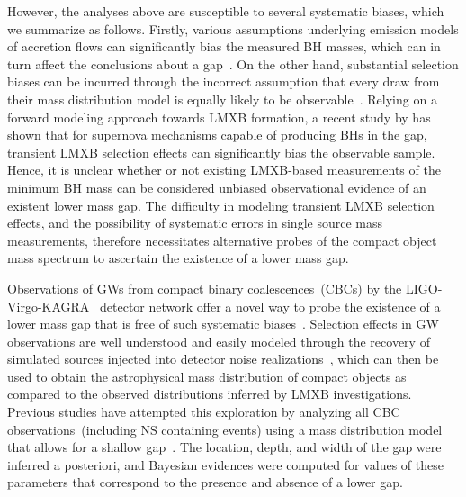 \documentclass[modern]{aastex631}
\begin{document}
However, the analyses above are susceptible to several systematic biases, which we summarize as follows. Firstly, various assumptions underlying emission models of accretion flows can significantly bias the measured BH masses, which can in turn affect the conclusions about a gap~\citep{Kreidberg:2012ud}. On the other hand, substantial selection biases can be incurred through the incorrect assumption that every draw from their mass distribution model is equally likely to be observable~\citep{Farr:2010tu, Siegel:2022gwc}. Relying on a forward modeling approach towards LMXB formation, a recent study by \cite{Siegel:2022gwc} has shown that for supernova mechanisms capable of producing BHs in the gap, transient LMXB selection effects can significantly bias the observable sample. Hence, it is unclear whether or not existing LMXB-based measurements of the minimum BH mass can be considered unbiased observational evidence of an existent lower mass gap. The difficulty in modeling transient LMXB selection effects, and the possibility of systematic errors in single source mass measurements, therefore necessitates alternative probes of the compact object mass spectrum to ascertain the existence of a lower mass gap.

Observations of GWs from compact binary coalescences~(CBCs) by the LIGO-Virgo-KAGRA~\citep[LVK, ][]{LIGOScientific:2014pky, VIRGO:2014yos, KAGRA:2020agh} detector network offer a novel way to probe the existence of a lower mass gap that is free of such systematic biases~\citep{Farah:2021qom,  LIGOScientific:2024elc, KAGRA:2021duu}. Selection effects in GW observations are well understood and easily modeled through the recovery of simulated sources injected into detector noise realizations~\citep{Thrane:2018qnx,Mandel:2018mve,popgw2,popgw3}, which can then be used to obtain the astrophysical mass distribution of compact objects as compared to the observed distributions inferred by LMXB investigations. Previous studies have attempted this exploration by analyzing all CBC observations~(including NS containing events) using a mass distribution model that allows for a shallow gap~\citep{Farah:2021qom,  KAGRA:2021duu, LIGOScientific:2024elc}. The location, depth, and width of the gap were inferred a posteriori, and Bayesian evidences were computed for values of these parameters that correspond to the presence and absence of a lower gap. 
\end{document}
